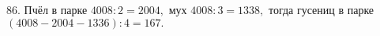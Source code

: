 86. Пчёл в парке $4008:2=2004,$ мух $4008:3=1338,$ тогда гусениц в парке $(4008-2004-1336):4=167.$\\
